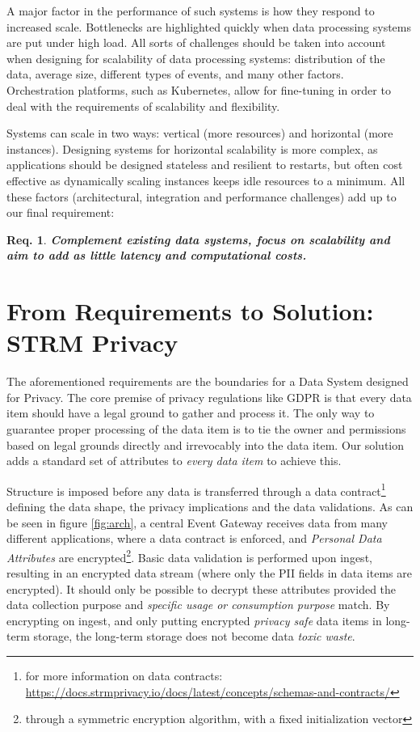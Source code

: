 \documentclass[11pt]{article} %
\newtheorem{requirement}{Req.}
\begin{document}
A major factor in the performance of such systems is how they respond to increased scale. Bottlenecks are highlighted quickly when data processing systems are put under high load. All sorts of challenges should be taken into account when designing for scalability of data processing systems: distribution of the data, average size, different types of events, and many other factors. Orchestration platforms, such as Kubernetes, allow for fine-tuning in order to deal with the requirements of scalability and flexibility.

Systems can scale in two ways: vertical (more resources) and horizontal (more instances). Designing systems for horizontal scalability is more complex, as applications should be designed stateless and resilient to restarts, but often cost effective as dynamically scaling instances keeps idle resources to a minimum. All these factors (architectural, integration and performance challenges) add up to our final requirement:
\begin{requirement}
\textit{\textbf{Complement existing data systems, focus on scalability and aim to add as little latency and computational costs.}}
\end{requirement}




\section{From Requirements to Solution: STRM Privacy}
The aforementioned requirements are the boundaries for a Data System designed for Privacy. The core premise of privacy regulations like GDPR is that every data item should have a legal ground to gather and process it. The only way to guarantee proper processing of the data item is to tie the owner and permissions based on legal grounds directly and irrevocably into the data item. Our solution adds a standard set of attributes to \emph{every data item} to achieve this.

Structure is imposed before any data is transferred through a data contract\footnote{for more information on data contracts: \url{https://docs.strmprivacy.io/docs/latest/concepts/schemas-and-contracts/}} defining the data shape, the privacy implications and the data validations. As can be seen in figure \ref{fig:arch}, a central Event Gateway receives data from many different applications, where a data contract is enforced, and \emph{Personal Data Attributes} are encrypted\footnote{through a symmetric encryption algorithm, with a fixed initialization vector}. Basic data validation is performed upon ingest, resulting in an encrypted data stream (where only the PII fields in data items are encrypted). It should only be possible to decrypt these attributes provided the data collection purpose and \emph{specific usage or consumption purpose} match. By encrypting on ingest, and only putting encrypted \textit{privacy safe} data items in long-term storage, the long-term storage does not become data \textit{toxic waste}.
\end{document}
